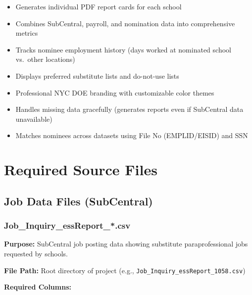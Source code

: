 \documentclass[12pt,letterpaper]{article}
\begin{document}
\begin{itemize}[leftmargin=*]
    \item Generates individual PDF report cards for each school
    \item Combines SubCentral, payroll, and nomination data into comprehensive metrics
    \item Tracks nominee employment history (days worked at nominated school vs.\ other locations)
    \item Displays preferred substitute lists and do-not-use lists
    \item Professional NYC DOE branding with customizable color themes
    \item Handles missing data gracefully (generates reports even if SubCentral data unavailable)
    \item Matches nominees across datasets using File No (EMPLID/EISID) and SSN
\end{itemize}

\section{Required Source Files}

\subsection{Job Data Files (SubCentral)}

\subsubsection{Job\_Inquiry\_essReport\_*.csv}

\textbf{Purpose:} SubCentral job posting data showing substitute paraprofessional jobs requested by schools.

\textbf{File Path:} Root directory of project (e.g., \texttt{Job\_Inquiry\_essReport\_1058.csv})

\textbf{Required Columns:}
\end{document}
